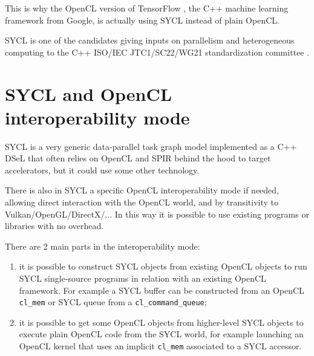 \documentclass[sigplan, review, authordraft]{acmart}
\begin{document}
This is why the OpenCL version of TensorFlow \cite{TensorFlow-1.0},
the C++ machine learning framework from Google, is actually using SYCL
instead of plain OpenCL.

SYCL is one of the candidates giving inputs on parallelism and
heterogeneous computing to the C++ ISO/IEC JTC1/SC22/WG21
standardization committee
\cite{C++:P00236R0:SYCL,C++:P0362R0,C++:P0363R0,C++:P0367R0}.
\iffalse
  WG21,
presented at C++ F2F committee Jacksonville 2016/02
 Oulu 2016/06
 Khronos committed to provide Open Source implementations of OpenCL and SYCL
\fi


\section{SYCL and OpenCL interoperability mode}
\label{sec:sycl-opencl-inter}

SYCL is a very generic data-parallel task graph model implemented as a
C++ DSeL that often relies on OpenCL and SPIR behind the hood to
target accelerators, but it could use some other technology.

There is also in SYCL a specific OpenCL interoperability mode if
needed, allowing direct interaction with the OpenCL world, and by
transitivity to Vulkan/OpenGL/DirectX/... In this way it is possible
to use existing programs or libraries with no overhead.

There are 2 main parts in the interoperability mode:
\begin{enumerate}
\item it is possible to construct SYCL objects from existing OpenCL
  objects to run SYCL single-source programs in relation with an
  existing OpenCL framework. For example a SYCL buffer can be
  constructed from an OpenCL \lstinline|cl_mem| or SYCL queue from a
  \lstinline|cl_command_queue|;
\item it is possible to get some OpenCL objects from higher-level SYCL
  objects to execute plain OpenCL code from the SYCL world, for
  example launching an OpenCL kernel that uses an implicit
  \lstinline|cl_mem| associated to a SYCL accessor.
\end{enumerate}
\end{document}
